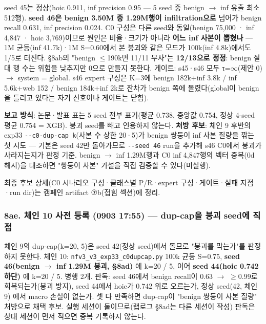 seed 45는 정상(hoic 0.911, inf precision 0.95 — 5 seed 중 benign \ensuremath{\rightarrow} inf 유출 최소 512행). \textbf{seed 46은 benign 3.50M 중 1.29M행이 infiltration으로} 넘어가 benign recall 0.631, inf precision 0.024. C0 구성은 다른 seed와 동일(benign 75,000 · inf 4,847 · hoic 3,769)이므로 원인은 비율·크기가 아니라 \textbf{어느 inf 사본이 뽑혔나} — 1M 균등(inf 41.7k)·1M S=\allowbreak{}0.60에서 본 붕괴와 같은 모드가 100k(inf 4.8k)에서도 1/\allowbreak{}5로 터진다. §8ab의 "benign \ensuremath{\leq}190k면 11/\allowbreak{}11 무사"는 \textbf{12/\allowbreak{}13으로 정정}: benign 절대 행 수는 위험을 낮추지만 0으로 만들지 못한다. 게이트: s45·s46 모두 τ=\allowbreak{}\ensuremath{\infty}(제안 0)  \ensuremath{\rightarrow}  system =\allowbreak{} global. s46 expert 구성은 K=\allowbreak{}3에 benign 182k+\allowbreak{}inf 3.8k /\allowbreak{} inf 5.6k+\allowbreak{}web 152 /\allowbreak{} benign 184k+\allowbreak{}inf 2k로 잔차가 benign 쪽에 몰렸다(global이 benign을 틀리고 있다는 자기 신호이나 게이트는 닫힘).

\textbf{보고 방식}: 논문·발표 표는 5 seed 전부 표기(평균 0.738, 중앙값 0.754, 정상 4-seed 평균 0.754 =\allowbreak{} XGB). 붕괴 seed를 빼고 인용하지 않는다. \textbf{처방 후보}: 체인 9 후반의 exp33 \texttt{-\allowbreak{}-\allowbreak{}c0-\allowbreak{}dup\allowbreak{}-\allowbreak{}cap k}(사본 수 상한 20·5)가 benign 쌍둥이 inf 사본 질량을 깎는 첫 시도 — 기본은 seed 42만 돌아가므로 \texttt{-\allowbreak{}-\allowbreak{}seed 4\allowbreak{}6} run을 추가해 s46 C0에서 붕괴가 사라지는지가 판정 기준. benign \ensuremath{\rightarrow} inf 1.29M행과 C0 inf 4,847행의 벡터 중복(0d 해시)을 대조하면 "쌍둥이 사본" 가설을 직접 검증할 수 있다(미실행).

최종 후보 상세(C0 시나리오 구성·클래스별 P/\allowbreak{}R·expert 구성·게이트·실패 지점·run dir)는 캠페인 artifact ⑦b(접힘 섹션)에 정리.

\subsubsection{8ae. 체인 10 사전 등록 (0903 17:55) — dup-cap을 붕괴 seed에 직접}
체인 9의 dup-cap(k=\allowbreak{}20, 5)은 seed 42(정상 seed)에서 돌므로 "붕괴를 막는가"를 판정하지 못한다. 체인 10: \texttt{nfv3\_\allowbreak{}\allowbreak{}v3\_\allowbreak{}\allowbreak{}exp33\_\allowbreak{}\allowbreak{}c0\allowbreak{}dupcap.\allowbreak{}p\allowbreak{}y} 100k 균등 S=\allowbreak{}0.75, \textbf{seed 46(benign \ensuremath{\rightarrow} inf 1.29M 붕괴, §8ad)} 에 k=\allowbreak{}20 /\allowbreak{} 5, 이어 \textbf{seed 44(hoic 0.742 하단)} 에 k=\allowbreak{}20 /\allowbreak{} 5. 병행 2개. 판독: seed 46에서 benign recall이 0.63  \ensuremath{\rightarrow}  \ensuremath{\geq}0.99로 회복되는가(붕괴 방지), seed 44에서 hoic가 0.742 위로 오르는가, 정상 seed(42, 체인 9) 에서 macro 손실이 없는가. 셋 다 만족하면 dup-cap이 "benign 쌍둥이 사본 질량" 처방으로 채택 후보. 실행 세션이 둘이므로(랩로그 §8ad는 다른 세션이 작성) 판독은 상대 세션이 먼저 적으면 중복 기록하지 않는다.

